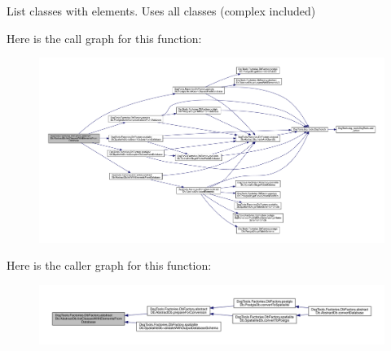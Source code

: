 \begin{DoxyVerb}List classes with elements. Uses all classes (complex included)
\end{DoxyVerb}
 Here is the call graph for this function\+:
\nopagebreak
\begin{figure}[H]
\begin{center}
\leavevmode
\includegraphics[width=350pt]{class_dsg_tools_1_1_factories_1_1_db_factory_1_1abstract_db_1_1_abstract_db_a6704c8b20fb6eba8872eaa8be66afa2c_cgraph}
\end{center}
\end{figure}
Here is the caller graph for this function\+:
\nopagebreak
\begin{figure}[H]
\begin{center}
\leavevmode
\includegraphics[width=350pt]{class_dsg_tools_1_1_factories_1_1_db_factory_1_1abstract_db_1_1_abstract_db_a6704c8b20fb6eba8872eaa8be66afa2c_icgraph}
\end{center}
\end{figure}
\mbox{\label{class_dsg_tools_1_1_factories_1_1_db_factory_1_1abstract_db_1_1_abstract_db_ac6982cd90c216b936defc2ae530e41a1}} 
